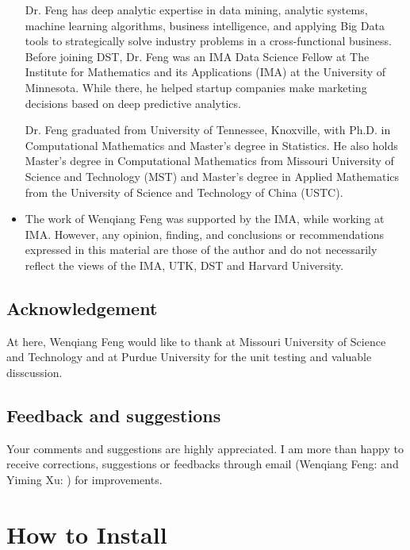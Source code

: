 \documentclass[letterpaper,12pt,english]{sphinxmanual}
\begin{document}
\begin{itemize}
Dr. Feng has deep analytic expertise in data mining, analytic systems, machine learning algorithms, business intelligence, and applying Big Data tools to strategically solve industry problems in a cross-functional business. Before joining DST, Dr. Feng was an IMA Data Science Fellow at The Institute for Mathematics and its Applications (IMA) at the University of Minnesota. While there, he helped startup companies make marketing decisions based on deep predictive analytics.

Dr. Feng graduated from University of Tennessee, Knoxville, with Ph.D. in Computational Mathematics and Master’s degree in Statistics. He also holds Master’s degree in Computational Mathematics from Missouri University of Science and Technology (MST) and Master’s degree in Applied Mathematics from the University of Science and Technology of China (USTC).

\item {} 

The work of Wenqiang Feng was supported by the IMA, while working at IMA. However, any opinion, finding, and conclusions or recommendations expressed in this material are those of the author and do not necessarily reflect the views of the IMA, UTK, DST and Harvard University.

\end{itemize}


\section{Acknowledgement}
\label{\detokenize{preface:acknowledgement}}
At here, Wenqiang Feng would like to thank  at Missouri University of Science and Technology and
 at Purdue University for the unit testing and valuable disscussion.


\section{Feedback and suggestions}
\label{\detokenize{preface:feedback-and-suggestions}}
Your comments and suggestions are highly appreciated. I am more than happy to receive
corrections, suggestions or feedbacks through email (Wenqiang Feng:  and Yiming Xu: ) for improvements.


\chapter{How to Install}
\label{\detokenize{install:how-to-install}}\label{\detokenize{install:install}}\label{\detokenize{install::doc}}
\end{document}

